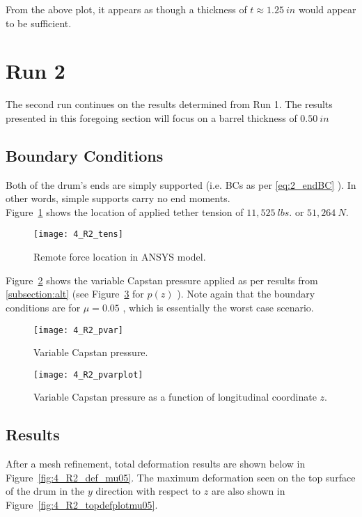 From the above plot, it appears as though a thickness of $t \approx 1.25 \ in$ would appear to be sufficient.

\section{Run 2}

The second run continues on the results determined from Run 1. The results presented in this foregoing section will focus on a barrel thickness of $0.50\ in$ 

\subsection{Boundary Conditions}

Both of the drum's ends are simply supported (i.e. BCs as per \ref{eq:2_endBC} ). In other words, simple supports carry no end moments.\\

Figure~\ref{fig:4_R2_tens} shows the location of applied tether tension of $11,525\ lbs.$ or $51,264\ N$.
\begin{figure}[H]
	\centering
	\texttt{[image: 4\_R2\_tens]}
	\caption{Remote force location in ANSYS model.}
	\label{fig:4_R2_tens}
\end{figure}

Figure~\ref{fig:4_R2_pvar} shows the variable Capstan pressure applied as per results from \ref{subsection:alt} (see Figure~\ref{fig:4_R2_pvarplot} for $p(z)$ ). Note again that the boundary conditions are for $\mu=0.05$ , which is essentially the worst case scenario.

\begin{figure}[H]
	\centering
	\texttt{[image: 4\_R2\_pvar]}
	\caption{Variable Capstan pressure.}
	\label{fig:4_R2_pvar}
\end{figure}
\begin{figure}[H]
	\centering
	\texttt{[image: 4\_R2\_pvarplot]}
	\caption{Variable Capstan pressure as a function of longitudinal coordinate $z$.}
	\label{fig:4_R2_pvarplot}
\end{figure}


\subsection{Results}

After a mesh refinement, total deformation results are shown below in Figure~\ref{fig:4_R2_def_mu05}. The maximum deformation seen on the top surface of the drum in the $y$ direction with respect to $z$ are also shown in Figure~\ref{fig:4_R2_topdefplotmu05}.

